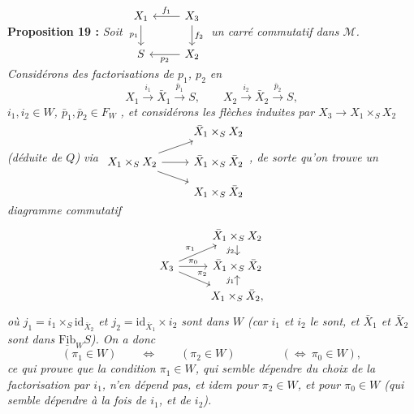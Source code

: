 \textbf{Proposition 19 :} \textit{Soit $\begin{tikzcd}[ampersand replacement=\&] X_1 \arrow[d, "p_1"'] \& X_3 \arrow[l, "f_1"'] \arrow[d, "f_2"] \\ S \& X_2 \arrow[l, "p_2"] \end{tikzcd}$ un carré commutatif dans $\mathcal{M}$. Considérons des factorisations de $p_1$, $p_2$ en}
\[
X_1\xrightarrow{\ i_1\ }\bar{X}_1\xrightarrow{\ \bar{p}_1\ }S,\qquad X_2\xrightarrow{\ i_2\ }\bar{X}_2\xrightarrow{\ \bar{p}_2\ }S,
\]
\textit{$i_1,i_2\in W$, $\bar{p}_1,\bar{p}_2\in F_W$} \textit{, et considérons les flèches induites par $X_3\longrightarrow X_1\times_S X_2$ (déduite de $Q$) via $\begin{tikzcd}[ampersand replacement=\&, row sep=small] \& \bar{X}_1\times_S X_2 \\ X_1\times_S X_2 \arrow[ur] \arrow[r] \arrow[dr] \& \bar{X}_1\times_S\bar{X}_2 \\ \& X_1\times_S\bar{X}_2 \end{tikzcd}$, de sorte qu'on trouve un diagramme commutatif}
\[
\begin{tikzcd}[ampersand replacement=\&, row sep=small]
\& \bar{X}_1\times_S X_2 \arrow[d, "j_2"'] \\
X_3 \arrow[ur, "\pi_1"] \arrow[r, "\pi_0"] \arrow[dr, "\pi_2"] \& \bar{X}_1\times_S\bar{X}_2 \\
\& X_1\times_S\bar{X}_2, \arrow[u, "j_1"]
\end{tikzcd}
\]
\textit{où $j_1=i_1\times_S\mathrm{id}_{\bar{X}_2}$ et $j_2=\mathrm{id}_{\bar{X}_1}\times i_2$ sont dans $W$ (car $i_1$ et $i_2$ le sont, et $\bar{X}_1$ et $\bar{X}_2$ sont dans $\underline{\mathrm{Fib}}_W S$). On a donc}
\[
(\pi_1\in W)\qquad\iff\qquad(\pi_2\in W)\qquad\qquad(\iff\ \pi_0\in W),
\]
\textit{ce qui prouve que la condition $\pi_1\in W$, qui semble dépendre du choix de la factorisation par $i_1$, n'en dépend pas, et idem pour $\pi_2\in W$, et pour $\pi_0\in W$ (qui semble dépendre à la fois de $i_1$, et de $i_2$).}

